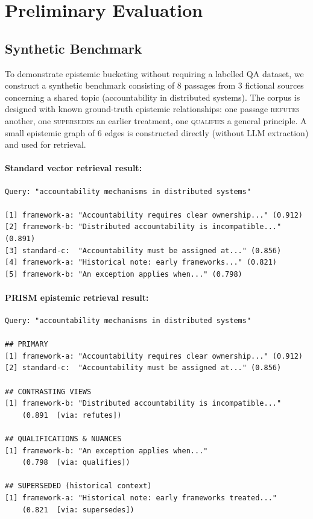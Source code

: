 \documentclass[11pt,a4paper]{article}
\begin{document}
\section{Preliminary Evaluation}
\label{sec:evaluation}

\subsection{Synthetic Benchmark}
\label{sec:synthetic}

To demonstrate epistemic bucketing without requiring a labelled QA dataset,
we construct a synthetic benchmark consisting of 8 passages from 3
fictional sources concerning a shared topic (accountability in distributed
systems). The corpus is designed with known ground-truth epistemic
relationships: one passage \textsc{refutes} another, one \textsc{supersedes}
an earlier treatment, one \textsc{qualifies} a general principle.
A small epistemic graph of 6 edges is constructed directly (without LLM
extraction) and used for retrieval.

\paragraph{Standard vector retrieval result:}
\begin{lstlisting}
Query: "accountability mechanisms in distributed systems"

[1] framework-a: "Accountability requires clear ownership..." (0.912)
[2] framework-b: "Distributed accountability is incompatible..." (0.891)
[3] standard-c:  "Accountability must be assigned at..." (0.856)
[4] framework-a: "Historical note: early frameworks..." (0.821)
[5] framework-b: "An exception applies when..." (0.798)
\end{lstlisting}

\paragraph{PRISM epistemic retrieval result:}
\begin{lstlisting}
Query: "accountability mechanisms in distributed systems"

## PRIMARY
[1] framework-a: "Accountability requires clear ownership..." (0.912)
[2] standard-c:  "Accountability must be assigned at..." (0.856)

## CONTRASTING VIEWS
[1] framework-b: "Distributed accountability is incompatible..."
    (0.891  [via: refutes])

## QUALIFICATIONS & NUANCES
[1] framework-b: "An exception applies when..."
    (0.798  [via: qualifies])

## SUPERSEDED (historical context)
[1] framework-a: "Historical note: early frameworks treated..."
    (0.821  [via: supersedes])
\end{lstlisting}
\end{document}
